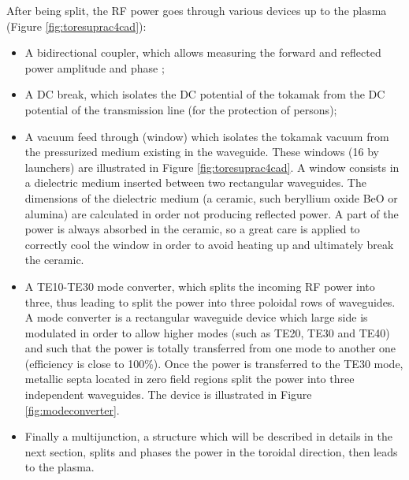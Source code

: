 After being split, the RF power goes through various devices up to the plasma (Figure \ref{fig:toresuprac4cad}): 
\begin{itemize}
	\item A bidirectional coupler, which allows measuring the forward and reflected power amplitude and phase ;
	\item A DC break, which isolates the DC potential of the tokamak from the DC potential of the transmission line (for the protection of persons);
	\item A vacuum feed through (window) which isolates the tokamak vacuum from the pressurized medium existing in the waveguide. These windows (16 by launchers) are illustrated in Figure \ref{fig:toresuprac4cad}. A window consists in a dielectric medium inserted between two rectangular waveguides. The dimensions of the dielectric medium (a ceramic, such beryllium oxide BeO or alumina) are calculated in order not producing reflected power. A part of the power is always absorbed in the ceramic, so a great care is applied to correctly cool the window in order to avoid heating up and ultimately break the ceramic.
	\item A TE10-TE30 mode converter, which splits the incoming RF power into three, thus leading to split the power into three poloidal rows of waveguides. A mode converter is a rectangular waveguide device which large side is modulated in order to allow higher modes (such as TE20, TE30 and TE40) and such that the power is totally transferred from one mode to another one (efficiency is close to 100\%). Once the power is transferred to the TE30 mode, metallic septa located in zero field regions split the power into three independent waveguides. The device is illustrated in Figure \ref{fig:modeconverter}.
	\item Finally a multijunction, a structure which will be described in details in the next section, splits and phases the power in the toroidal direction, then leads to the plasma. 
\end{itemize}


%
%
